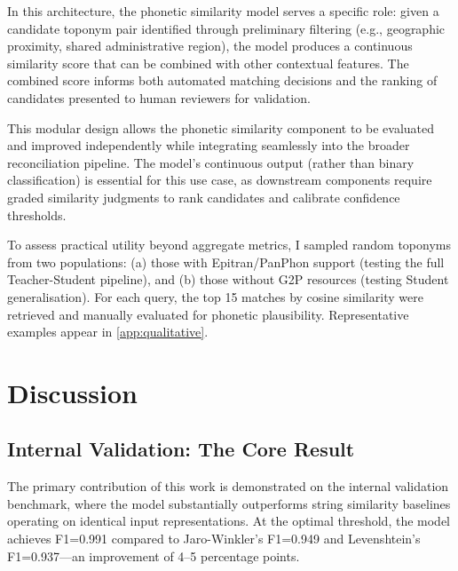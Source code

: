 \documentclass[11pt]{article}
\begin{document}
    In this architecture, the phonetic similarity model serves a specific role:
    given a candidate toponym pair identified through preliminary filtering
    (e.g., geographic proximity, shared administrative region), the model
    produces a continuous similarity score that can be combined with other
    contextual features. The combined score informs both automated matching
    decisions and the ranking of candidates presented to human reviewers for
    validation.

    This modular design allows the phonetic similarity component to be evaluated
    and improved independently while integrating seamlessly into the broader
    reconciliation pipeline. The model's continuous output (rather than binary
    classification) is essential for this use case, as downstream components
    require graded similarity judgments to rank candidates and calibrate
    confidence thresholds.

    To assess practical utility beyond aggregate metrics, I sampled random
    toponyms from two populations: (a) those with Epitran/PanPhon support
    (testing the full Teacher-Student pipeline), and (b) those without G2P
    resources (testing Student generalisation). For each query, the top 15
    matches by cosine similarity were retrieved and manually evaluated for
    phonetic plausibility. Representative examples appear in \autoref{app:qualitative}.



    \section{Discussion}
    \label{sec:discussion}

    \subsection{Internal Validation: The Core Result}

    The primary contribution of this work is demonstrated on the internal validation
    benchmark, where the model substantially outperforms string similarity baselines
    operating on identical input representations. At the optimal threshold, the model
    achieves F1=0.991 compared to Jaro-Winkler's F1=0.949 and Levenshtein's F1=0.937---an
    improvement of 4--5 percentage points.
\end{document}
